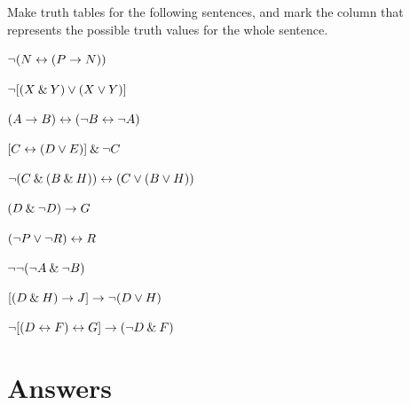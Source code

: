 \problempart
Make truth tables for the following sentences, and mark the column that represents the possible truth values for the whole sentence.

\begin{earg}

\item ${\neg} (N \leftrightarrow (P \rightarrow N))$

\item ${\neg} [(X \mathbin{\&} Y) \vee (X \vee Y)]$

\item $(A \rightarrow B) \leftrightarrow ({\neg} B\leftrightarrow {\neg} A)$

\item $[C \leftrightarrow (D \vee E)] \mathbin{\&} {\neg} C$

\item ${\neg}(C \mathbin{\&} (B \mathbin{\&} H)) \leftrightarrow (C \vee (B \vee H))$

\item	$(D \mathbin{\&} {\neg} D) \rightarrow G $

\item	$({\neg} P \vee {\neg} R) \leftrightarrow R $

\item	${\neg} {\neg} ({\neg} A \mathbin{\&} {\neg} B)  $

\item 	$[(D \mathbin{\&} H) \rightarrow J] \rightarrow {\neg}(D \vee H) $

\item	${\neg} [(D \leftrightarrow F) \leftrightarrow G] \rightarrow ({\neg} D \mathbin{\&} F) $

\end{earg}





\section{Answers}
\setcounter{ProbPart}{0}

\problempart\label{pr.TT.TTorC-a}

